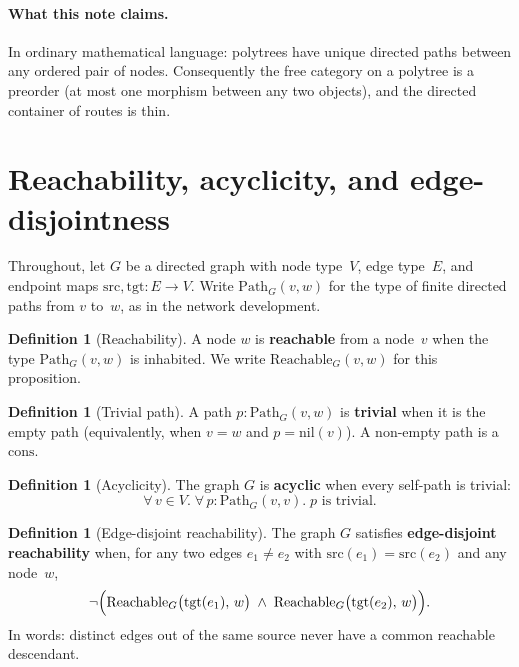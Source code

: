 \documentclass[11pt,a4paper]{article}
\theoremstyle{plain}
\theoremstyle{definition}
\newtheorem{definition}[theorem]{Definition}
\newcommand{\src}{\mathrm{src}}
\newcommand{\tgt}{\mathrm{tgt}}
\begin{document}
\paragraph{What this note claims.}
In ordinary mathematical language: polytrees have unique directed paths between
any ordered pair of nodes. Consequently the free category on a polytree is a
preorder (at most one morphism between any two objects), and the directed
container of routes is thin.

\section{Reachability, acyclicity, and edge-disjointness}

Throughout, let $G$ be a directed graph with node type~$V$, edge type~$E$, and
endpoint maps $\src,\tgt : E \to V$. Write $\mathrm{Path}_G(v,w)$ for the type
of finite directed paths from $v$ to~$w$, as in the network development.

\begin{definition}[Reachability]\label{def:reachable}
A node $w$ is \textbf{reachable} from a node~$v$ when the type
$\mathrm{Path}_G(v,w)$ is inhabited. We write $\mathrm{Reachable}_G(v,w)$ for
this proposition.
\end{definition}

\begin{definition}[Trivial path]\label{def:trivial}
A path $p : \mathrm{Path}_G(v,w)$ is \textbf{trivial} when it is the empty path
(equivalently, when $v = w$ and $p = \mathrm{nil}(v)$). A non-empty path is a
$\mathrm{cons}$.
\end{definition}

\begin{definition}[Acyclicity]\label{def:acyclic}
The graph $G$ is \textbf{acyclic} when every self-path is trivial:
\begin{equation}
  \forall\, v \in V.\;
  \forall\, p : \mathrm{Path}_G(v,v).\;
  \text{$p$ is trivial}.
\end{equation}
\end{definition}

\begin{definition}[Edge-disjoint reachability]\label{def:edge-disjoint}
The graph $G$ satisfies \textbf{edge-disjoint reachability} when, for any two
edges $e_1 \neq e_2$ with $\src(e_1) = \src(e_2)$ and any node~$w$,
\begin{equation}
  \neg\Bigl(
    \mathrm{Reachable}_G\bigl(\tgt(e_1),\, w\bigr)
    \;\wedge\;
    \mathrm{Reachable}_G\bigl(\tgt(e_2),\, w\bigr)
  \Bigr).
\end{equation}
In words: distinct edges out of the same source never have a common reachable
descendant.
\end{definition}
\end{document}
